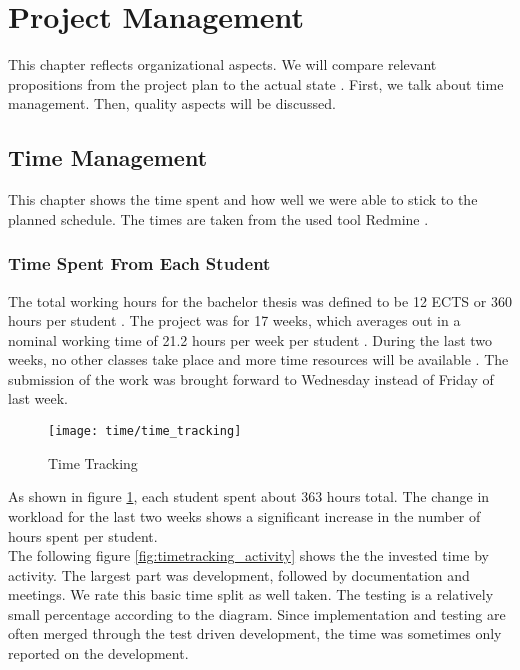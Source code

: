 \section{Project Management}
\label{section:project_management}
This chapter reflects organizational aspects.
We will compare relevant propositions from the project plan to the actual state \cite{projectplan}.
First, we talk about time management. Then, quality aspects will be discussed.

\subsection{Time Management}
This chapter shows the time spent and how well we were able to stick to the planned schedule.
The times are taken from the used tool Redmine \cite{redmine}.

\subsubsection{Time Spent From Each Student}
The total working hours for the bachelor thesis was defined to be 12 ECTS or 360 hours per student \cite{projectplan}.
The project was for 17 weeks, which averages out in a nominal working time of 21.2 hours per week per student \cite{projectplan}.
During the last two weeks, no other classes take place and more time resources will be available \cite{projectplan}.
The submission of the work was brought forward to Wednesday instead of Friday of last week.

\begin{figure}[H]
    \centering
    \texttt{[image: time/time\_tracking]}
    \caption{Time Tracking}
    \label{fig:timetracking}
\end{figure}

As shown in figure \ref{fig:timetracking}, each student spent about 363 hours total.
The change in workload for the last two weeks shows a significant increase in the number of hours spent per student. \\

The following figure \ref{fig:timetracking_activity} shows the the invested time by activity.
The largest part was development, followed by documentation and meetings.
We rate this basic time split as well taken.
The testing is a relatively small percentage according to the diagram.
Since implementation and testing are often merged through the test driven development,
the time was sometimes only reported on the development.

